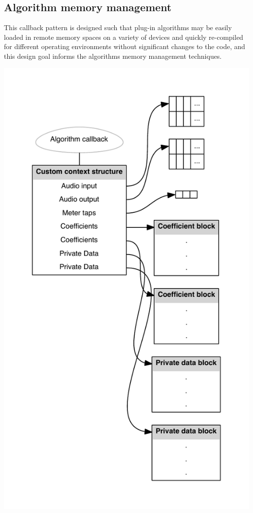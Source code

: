  \hypertarget{a00327_alg_memmgmt}{}\subsection{Algorithm memory management}\label{a00327_alg_memmgmt}
 This callback pattern is designed such that plug-\/in algorithms may be easily loaded in remote memory spaces on a variety of devices and quickly re-\/compiled for different operating environments without significant changes to the code, and this design goal informs the algorithm\textquotesingle{}s memory management techniques.

 
\begin{DoxyImageNoCaption}
  \mbox{\includegraphics[width=\textwidth,height=\textheight/2,keepaspectratio=true]{dot_aax_alg_context}}
\end{DoxyImageNoCaption}


